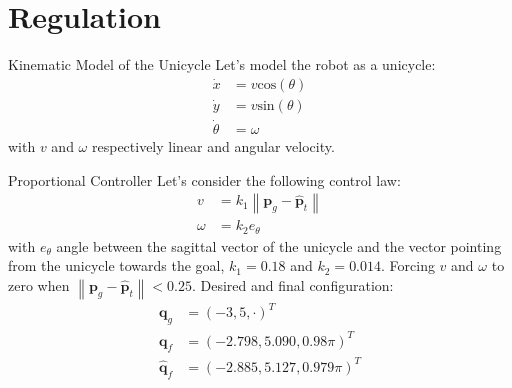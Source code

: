 \documentclass[10pt]{beamer}
\begin{document}
    \section{Regulation}

    \begin{frame}{Kinematic Model of the Unicycle}
        Let's model the robot as a unicycle:
        \begin{align*}
            \dot{x} &= v \text{cos}(\theta) \\
            \dot{y} &= v \text{sin}(\theta) \\
            \dot{\theta} &= \omega
        \end{align*}
        with $v$ and $\omega$ respectively linear and angular velocity.
    \end{frame}

    \begin{frame}{Proportional Controller}
        \justifying
        Let's consider the following control law:
        \begin{align*}
            v &= k_1 \left\| \bm{p}_g - \bm{\hat{p}}_t \right\| \\
            \omega &= k_2 e_{\theta}
        \end{align*}
        with $e_\theta$ angle between the sagittal vector of the unicycle
        and the vector pointing from the unicycle towards the goal, $k_1 =
        0.18$ and $k_2 = 0.014$. Forcing $v$ and $\omega$ to zero when
        $\left\|\bm{p}_g - \bm{\hat{p}}_t \right\| < 0.25$.
        Desired and final configuration:
        \begin{align*}
            \bm{q}_g &= (-3, 5, \cdot)^T \\
            \bm{q}_f &= (-2.798, 5.090, 0.98\pi)^T \\
            \bm{\hat{q}}_f &= (-2.885, 5.127, 0.979\pi)^T
        \end{align*}
    \end{frame}

\end{document}
